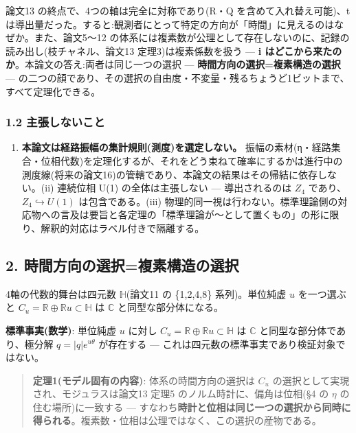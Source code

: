 \documentclass[
]{ltjsarticle}
\providecommand{\tightlist}{%
  \setlength{\itemsep}{0pt}\setlength{\parskip}{0pt}}
\begin{document}
論文13 の終点で、4つの軸は完全に対称であり(R・Q を含めて入れ替え可能)、t
は導出量だった。すると:観測者にとって特定の方向が「時間」に見えるのはなぜか。また、論文5〜12
の体系には複素数が公理として存在しないのに、記録の読み出し(枝チャネル、論文13
定理3)は複素係数を扱う --- \textbf{i
はどこから来たのか}。本論文の答え:両者は同じ一つの選択 ---
\textbf{時間方向の選択=複素構造の選択} ---
の二つの顔であり、その選択の自由度・不変量・残るちょうど1ビットまで、すべて定理化できる。

\subsubsection{1.2
主張しないこと}\label{ux4e3bux5f35ux3057ux306aux3044ux3053ux3068}

\begin{enumerate}
\def\labelenumi{(\roman{enumi})}
\tightlist
\item
  \textbf{本論文は経路振幅の集計規則(測度)を選定しない。}
  振幅の素材(η・経路集合・位相代数)を定理化するが、それをどう束ねて確率にするかは進行中の測度線(将来の論文16)の管轄であり、本論文の結果はその帰結に依存しない。(ii)
  連続位相 U(1) の全体は主張しない --- 導出されるのは \(Z_4\)
  であり、\(Z_4\hookrightarrow U(1)\) は包含である。(iii)
  物理的同一視は行わない。標準理論側の対応物への言及は要旨と各定理の「標準理論が〜として置くもの」の形に限り、解釈的対応はラベル付きで隔離する。
\end{enumerate}

\subsection{2.
時間方向の選択=複素構造の選択}\label{ux6642ux9593ux65b9ux5411ux306eux9078ux629eux8907ux7d20ux69cbux9020ux306eux9078ux629e}

4軸の代数的舞台は四元数 \(\mathbb{H}\)(論文11 の \{1,2,4,8\}
系列)。単位純虚 \(u\) を一つ選ぶと
\(C_u=\mathbb{R}\oplus\mathbb{R}u\subset\mathbb{H}\) は \(\mathbb{C}\)
と同型な部分体になる。

\textbf{標準事実(数学)}: 単位純虚 \(u\) に対し
\(C_u=\mathbb{R}\oplus\mathbb{R}u\subset\mathbb{H}\) は \(\mathbb{C}\)
と同型な部分体であり、極分解 \(q=|q|e^{u\theta}\) が存在する ---
これは四元数の標準事実であり検証対象ではない。

\begin{quote}
\textbf{定理1(モデル固有の内容)}: 体系の時間方向の選択は \(C_u\)
の選択として実現され、モジュラスは論文13 定理5
のノルム時計に、偏角は位相(§4 の \(\eta\) の住む場所)に一致する ---
すなわち\textbf{時計と位相は同じ一つの選択から同時に得られる}。複素数・位相は公理ではなく、この選択の産物である。
\end{quote}
\end{document}
